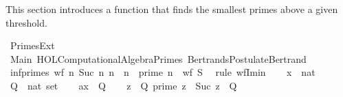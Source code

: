 %
\begin{isabellebody}%
%
%
\isadelimdocument
%
\endisadelimdocument
%
\isatagdocument
%
\isamarkuptrue%
%
\endisatagdocument
{\isafolddocument}%
%
\isadelimdocument
%
\endisadelimdocument
%
\begin{isamarkuptext}%
This section introduces a function that finds the smallest primes above a given threshold.%
\end{isamarkuptext}\isamarkuptrue%
%
\isadelimtheory
%
\endisadelimtheory
%
\isatagtheory
{}\isamarkupfalse%
\ Primes{\isacharunderscore}{\kern0pt}Ext\isanewline
{}\ Main\ {\isachardoublequoteopen}HOL{\isacharminus}{\kern0pt}Computational{\isacharunderscore}{\kern0pt}Algebra{\isachardot}{\kern0pt}Primes{\isachardoublequoteclose}\ {\isachardoublequoteopen}Bertrands{\isacharunderscore}{\kern0pt}Postulate{\isachardot}{\kern0pt}Bertrand{\isachardoublequoteclose}\ \isanewline
{}%
\endisatagtheory
{\isafoldtheory}%
%
\isadelimtheory
%
\endisadelimtheory
\isanewline
\isanewline
{}\isamarkupfalse%
\ inf{\isacharunderscore}{\kern0pt}primes{\isacharcolon}{\kern0pt}\ {\isachardoublequoteopen}wf\ {\isacharparenleft}{\kern0pt}{\isacharparenleft}{\kern0pt}{\isasymlambda}n{\isachardot}{\kern0pt}\ {\isacharparenleft}{\kern0pt}Suc\ n{\isacharcomma}{\kern0pt}\ n{\isacharparenright}{\kern0pt}{\isacharparenright}{\kern0pt}\ {\isacharbackquote}{\kern0pt}\ {\isacharbraceleft}{\kern0pt}n{\isachardot}{\kern0pt}\ {\isasymnot}\ {\isacharparenleft}{\kern0pt}prime\ n{\isacharparenright}{\kern0pt}{\isacharbraceright}{\kern0pt}{\isacharparenright}{\kern0pt}{\isachardoublequoteclose}\ {\isacharparenleft}{\kern0pt}\ {\isachardoublequoteopen}wf\ {\isacharquery}{\kern0pt}S{\isachardoublequoteclose}{\isacharparenright}{\kern0pt}\ \isanewline
%
\isadelimproof
%
\endisadelimproof
%
\isatagproof
{}\isamarkupfalse%
\ {\isacharparenleft}{\kern0pt}rule\ wfI{\isacharunderscore}{\kern0pt}min{\isacharparenright}{\kern0pt}\isanewline
\ \ \isamarkupfalse%
\ x\ {\isacharcolon}{\kern0pt}{\isacharcolon}{\kern0pt}\ nat\isanewline
\ \ \isamarkupfalse%
\ Q\ {\isacharcolon}{\kern0pt}{\isacharcolon}{\kern0pt}\ {\isachardoublequoteopen}nat\ set{\isachardoublequoteclose}\isanewline
\ \ \isamarkupfalse%
\ a{\isacharcolon}{\kern0pt}{\isachardoublequoteopen}x\ {\isasymin}\ Q{\isachardoublequoteclose}\isanewline
\isanewline
\ \ \isamarkupfalse%
\ {\isachardoublequoteopen}{\isasymexists}z\ {\isasymin}\ Q{\isachardot}{\kern0pt}\ prime\ z\ {\isasymor}\ Suc\ z\ {\isasymnotin}\ Q{\isachardoublequoteclose}\ \isanewline

\end{isabellebody}
